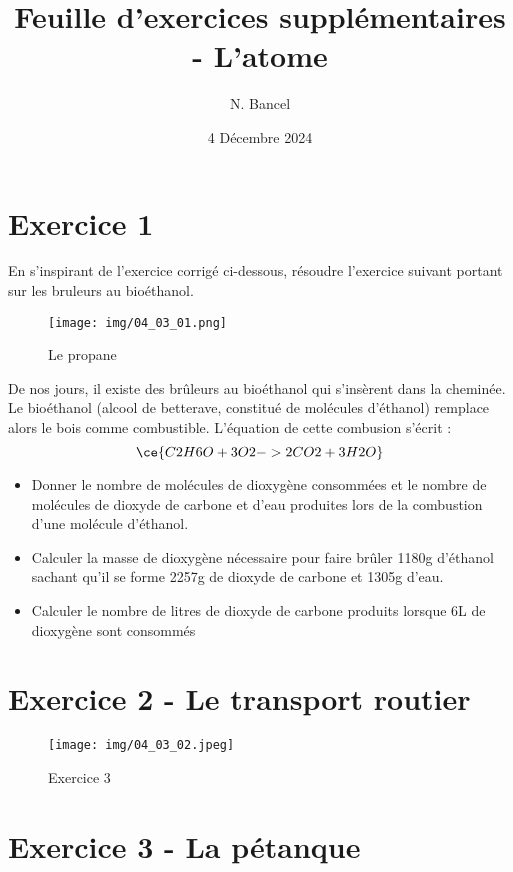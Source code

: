\documentclass[a4paper,12pt]{article}
\begin{document}
\title{Feuille d'exercices supplémentaires - L'atome}
\author{N. Bancel}
\date{4 Décembre 2024}
\maketitle

\section{Exercice 1}

En s'inspirant de l'exercice corrigé ci-dessous, résoudre l'exercice suivant portant sur les bruleurs au bioéthanol.

\begin{figure}[H]
  \centering
  \texttt{[image: img/04\_03\_01.png]}
  \caption{\label{} Le propane}
\end{figure}

De nos jours, il existe des brûleurs au bioéthanol qui s'insèrent dans la cheminée. Le bioéthanol (alcool de betterave, constitué de molécules d'éthanol) remplace alors le bois comme combustible. L'équation de cette combusion s'écrit : 
\[
\ce{C2H6O + 3 O2 -> 2 CO2 + 3 H2O}
\]
\begin{itemize}[noitemsep]
  \item Donner le nombre de molécules de dioxygène consommées et le nombre de molécules de dioxyde de carbone et d'eau produites lors de la combustion d'une molécule d'éthanol.
  \item Calculer la masse de dioxygène nécessaire pour faire brûler 1180g d'éthanol sachant qu'il se forme 2257g de dioxyde de carbone et 1305g d'eau.
  \item Calculer le nombre de litres de dioxyde de carbone produits lorsque 6L de dioxygène sont consommés
\end{itemize}

\section{Exercice 2 - Le transport routier}

\begin{figure}[H]
  \centering
  \texttt{[image: img/04\_03\_02.jpeg]}
  \caption{\label{} Exercice 3}
\end{figure}


\section{Exercice 3 - La pétanque}
\end{document}
